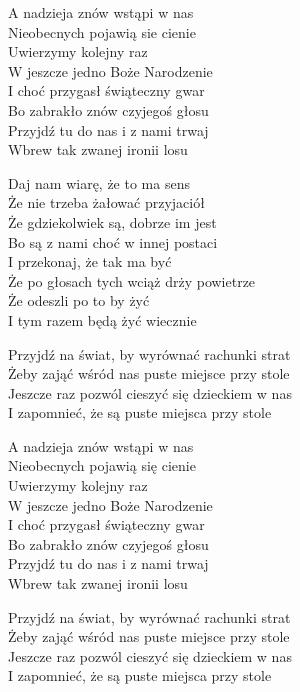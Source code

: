 \begin{text}
    A nadzieja znów wstąpi w nas\\
    Nieobecnych pojawią sie cienie\\
    Uwierzymy kolejny raz\\
    W jeszcze jedno Boże Narodzenie\\
    I choć przygasł świąteczny gwar\\
    Bo zabrakło znów czyjegoś głosu\\
    Przyjdź tu do nas i z nami trwaj\\
    Wbrew tak zwanej ironii losu

    Daj nam wiarę, że to ma sens\\
    Że nie trzeba żałować przyjaciół\\
    Że gdziekolwiek są, dobrze im jest\\
    Bo są z nami choć w innej postaci\\
    I przekonaj, że tak ma być\\
    Że po głosach tych wciąż drży powietrze\\
    Że odeszli po to by żyć\\
    I tym razem będą żyć wiecznie

    \vin Przyjdź na świat, by wyrównać rachunki strat\\
    \vin Żeby zająć wśród nas puste miejsce przy stole\\
    \vin Jeszcze raz pozwól cieszyć się dzieckiem w nas\\
    \vin I zapomnieć, że są puste miejsca przy stole

    A nadzieja znów wstąpi w nas\\
    Nieobecnych pojawią się cienie\\
    Uwierzymy kolejny raz\\
    W jeszcze jedno Boże Narodzenie\\
    I choć przygasł świąteczny gwar\\
    Bo zabrakło znów czyjegoś głosu\\
    Przyjdź tu do nas i z nami trwaj\\
    Wbrew tak zwanej ironii losu

    \vin Przyjdź na świat, by wyrównać rachunki strat\\
    \vin Żeby zająć wśród nas puste miejsce przy stole\\
    \vin Jeszcze raz pozwól cieszyć się dzieckiem w nas\\
    \vin I zapomnieć, że są puste miejsca przy stole
\end{text}
